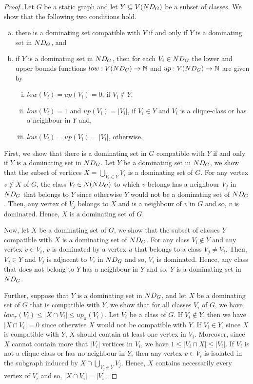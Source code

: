 \begin{proof}
  Let $G$ be a static graph and let $Y \subseteq V(\ndg[G])$ be a subset of classes. We show that the following two conditions hold.
  \begin{enumerate}[(a)]
    \item there is a dominating set compatible with $Y$ if and only if $Y$ is a dominating set in $\ndg[G]$, and
    \item if $Y$ is a dominating set in $\ndg[G]$, then for each $V_i \in \ndg[G]$ the lower and upper bounds functions $low : V(\ndg[G])  \to \mathbb{N}$ and $up : V(\ndg[G]) \to \mathbb{N}$ are given by
    \begin{enumerate}[(i)]
      \item $low(V_i) = up(V_i) =0$, if $V_i\not\in Y$,
      \item $low(V_i) = 1$ and $up(V_i) = |V_i|$, if $V_i\in Y$ and $V_i$ is a clique-class or has a neighbour in $Y$ and,
      \item $low(V_i) = up(V_i) =|V_i|$, otherwise.
    \end{enumerate}
  \end{enumerate}
  
  First, we show that there is a dominating set in $G$ compatible with $Y$ if and only if $Y$ is a dominating set in $\ndg[G]$.
  Let $Y$ be a dominating set in $\ndg[G]$, we show that the subset of vertices $X = \bigcup\limits_{V_i \in Y} V_i$ is a dominating set of $G$. For any vertex $v \not \in X$ of $G$, the class $V_i \in N(\ndg[G])$ to which $v$ belongs has a neighbour $V_j$ in $\ndg[G]$ that belongs to $Y$ since otherwise $Y$ would not be a dominating set of $\ndg[G]$. Then, any vertex of $V_j$ belongs to $X$ and is a neighbour of $v$ in $G$ and so, $v$ is dominated. Hence, $X$ is a dominating set of $G$.
  
  Now, let $X$ be a dominating set of $G$, we show that the subset of classes $Y$ compatible with $X$ is a dominating set of $\ndg[G]$. For any class $V_i \not \in Y$ and any vertex $v \in V_i$, $v$ is dominated by a vertex $u$ that belongs to a class $V_j \neq V_i$. Then, $V_j \in Y$ and $V_j$ is adjacent to $V_i$ in $\ndg[G]$ and so, $V_i$ is dominated. Hence, any class that does not belong to $Y$ has a neighbour in $Y$ and so, $Y$ is a dominating set in $\ndg[G]$.

  
Further, suppose that $Y$ is a dominating set in $\ndg[G]$, %
and let $X$ be a dominating set of $G$ that is compatible with $Y$, we show that for all classes $V_i$ of $G$, we have $low_\pi(V_i) \leq |X \cap V_i| \leq up_\pi(V_i)$.
  Let $V_i$ be a class of $G$.
  If $V_i\not\in Y$, then we have $|X \cap V_i| = 0$ since otherwise $X$ would not be compatible with $Y$. 
  If $V_i\in Y$, since $X$ is compatible with $Y$, $X$ should contain at least one vertex in $V_i$. Moreover, since $X$ cannot contain more that $|V_i|$ vertices in $V_i$, we have $1 \leq |V_i \cap X| \leq |V_i|$.
  If $V_i$ is not a clique-class or has no neighbour in $Y$, then any vertex $v \in V_i$ is isolated in the subgraph induced by $X \cap \bigcup_{V_j \in Y} V_j$. Hence, $X$ contains necessarily every vertex of $V_i$ and so, $|X \cap V_i| = |V_i|$.


\end{proof}
